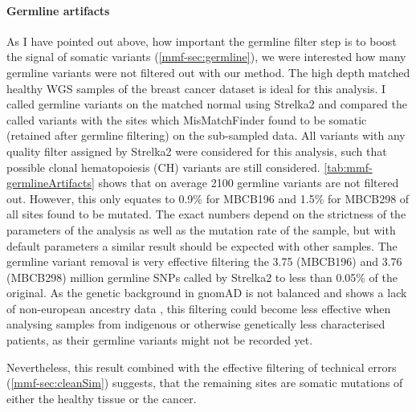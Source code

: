 
\paragraph{Germline artifacts}
\label{mmf-sec:germlineArtifacts}
As I have pointed out above, how important the germline filter step is to boost the signal of somatic variants (\autoref{mmf-sec:germline}), we were interested how many germline variants were not filtered out with our method. The high depth matched healthy WGS samples of the breast cancer dataset is ideal for this analysis. I called germline variants on the matched normal using Strelka2 and compared the called variants with the sites which MisMatchFinder found to be somatic (retained after germline filtering) on the sub-sampled data.  All variants with any quality filter assigned by Strelka2 were considered for this analysis, such that possible clonal hematopoiesis (CH) variants are still considered. \autoref{tab:mmf-germlineArtifacts} shows that on average 2100 germline variants are not filtered out. However, this only equates to 0.9\% for MBCB196 and 1.5\% for MBCB298 of all sites found to be mutated. The exact numbers depend on the strictness of the parameters of the analysis as well as the mutation rate of the sample, but with default parameters a similar result should be expected with other samples. The germline variant removal is very effective filtering the 3.75 (MBCB196) and 3.76 (MBCB298) million germline SNPs called by Strelka2 to less than 0.05\% of the original. As the genetic background in gnomAD is not balanced and shows a lack of non-european ancestry data \cite{Tiao2020}, this filtering could become less effective when analysing samples from indigenous or otherwise genetically less characterised patients, as their germline variants might not be recorded yet.


Nevertheless, this result combined with the effective filtering of technical errors (\autoref{mmf-sec:cleanSim}) suggests, that the remaining sites are somatic mutations of either the healthy tissue or the cancer.

